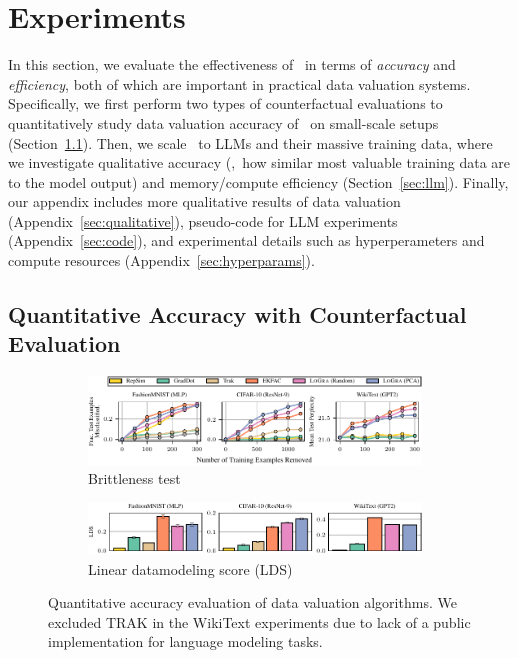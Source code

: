 \section{Experiments}
\label{sec:experiments}
In this section, we evaluate the effectiveness of \method\ in terms of \textit{accuracy} and \textit{efficiency}, both of which are important in practical data valuation systems. Specifically, we first perform two types of counterfactual evaluations to quantitatively study data valuation accuracy of \method\ on small-scale setups (Section~\ref{sec:brittleness}). Then, we scale \method\ to LLMs and their massive training data, where we investigate qualitative accuracy (\ie,\ how similar most valuable training data are to the model output) and memory/compute efficiency (Section~\ref{sec:llm}). Finally, our appendix includes more qualitative results of data valuation (Appendix~\ref{sec:qualitative}), pseudo-code for LLM experiments (Appendix~\ref{sec:code}), and experimental details such as hyperperameters and compute resources (Appendix~\ref{sec:hyperparams}).


\subsection{Quantitative Accuracy with Counterfactual Evaluation}
\label{sec:brittleness}

\begin{figure}[htbp]
    \centering
    \begin{subfigure}[b]{\textwidth}
        \centering
        \includegraphics[width=0.97\textwidth]{figures/logra_subset_removal.pdf}
        \vskip -3pt
        \caption{Brittleness test}
        \label{fig:subset}
    \end{subfigure}
    \vskip 5pt
    \begin{subfigure}[b]{\textwidth}
        \centering
        \includegraphics[width=0.97\textwidth]
        {figures/logra_lds_bar.pdf}
        \vskip -3pt
        \caption{Linear datamodeling score (LDS)}
        \label{fig:lds}
    \end{subfigure}
    \vskip -3pt
    \caption{Quantitative accuracy evaluation of data valuation algorithms. We excluded TRAK in the WikiText experiments due to lack of a public implementation for language modeling tasks.}
    \label{fig:quantitative}
\end{figure}

